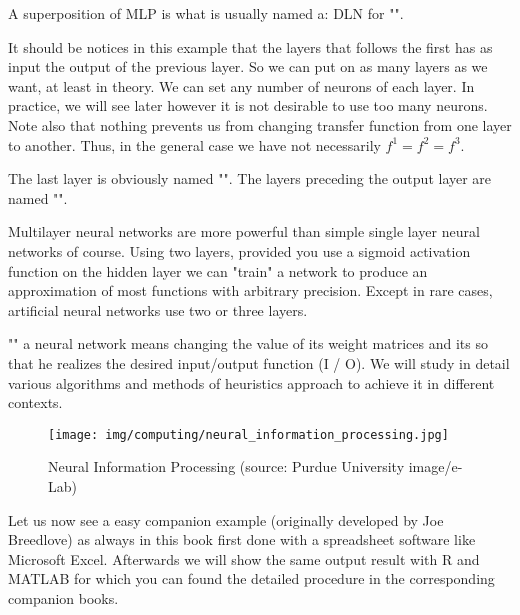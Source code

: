 	\begin{tcolorbox}[title=Remark,colframe=black,arc=10pt]
	A superposition of MLP is what is usually named a: DLN for "".
	\end{tcolorbox}
	It should be notices in this example that the layers that follows the first has as input the output of the previous layer. So we can put on as many layers as we want, at least in theory. We can set any number of neurons of each layer. In practice, we will see later however it is not desirable to use too many neurons. Note also that nothing prevents us from changing transfer function from one layer to another. Thus, in the general case we have not necessarily $f^1=f^2=f^3$.
	
	The last layer is obviously named "". The layers preceding the output layer are named "".
	
	\begin{tcolorbox}[title=Remark,colframe=black,arc=10pt]
	Multilayer neural networks are more powerful than simple single layer neural networks of course. Using two layers, provided you use a sigmoid activation function on the hidden layer we can "train" a network to produce an approximation of most functions with arbitrary precision. Except in rare cases, artificial neural networks use two or three layers.
	\end{tcolorbox}
	"" a neural network means changing the value of its weight matrices and its so that he realizes the desired input/output function (I / O). We will study in detail various algorithms and methods of heuristics approach to achieve it in different contexts.
	
	\begin{figure}[H]
		\centering
		\texttt{[image: img/computing/neural\_information\_processing.jpg]}
		\caption{Neural Information Processing (source: Purdue University image/e-Lab)}
	\end{figure}
	Let us now see a easy companion example (originally developed by Joe Breedlove) as always in this book first done with a spreadsheet software like Microsoft Excel. Afterwards we will show the same output result with R and MATLAB for which you can found the detailed procedure in the corresponding companion books.
	
